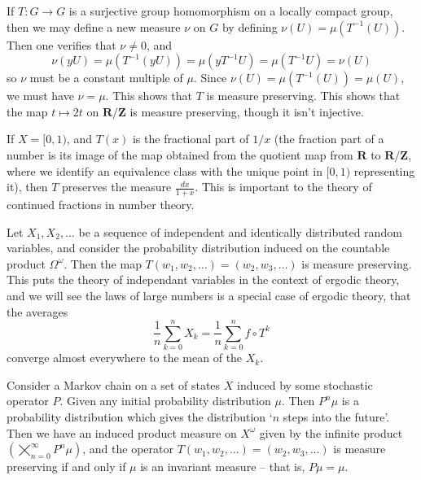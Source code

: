 \begin{example}
    If $T: G \to G$ is a surjective group homomorphism on a locally compact group, then we may define a new measure $\nu$ on $G$ by defining $\nu(U) = \mu(T^{-1}(U))$. Then one verifies that $\nu \neq 0$, and
    \[ \nu(yU) = \mu(T^{-1}(yU)) = \mu(yT^{-1}U) = \mu(T^{-1}U) = \nu(U) \]
    so $\nu$ must be a constant multiple of $\mu$. Since $\nu(U) = \mu(T^{-1}(U)) = \mu(U)$, we must have $\nu = \mu$. This shows that $T$ is measure preserving. This shows that the map $t \mapsto 2t$ on $\mathbf{R}/\mathbf{Z}$ is measure preserving, though it isn't injective.
\end{example}

\begin{example}
    If $X = [0,1)$, and $T(x)$ is the fractional part of $1/x$ (the fraction part of a number is its image of the map obtained from the quotient map from $\mathbf{R}$ to $\mathbf{R}/\mathbf{Z}$, where we identify an equivalence class with the unique point in $[0,1)$ representing it), then $T$ preserves the measure $\frac{dx}{1+x}$. This is important to the theory of continued fractions in number theory.
\end{example}

\begin{example}
    Let $X_1, X_2, \dots$ be a sequence of independent and identically distributed random variables, and consider the probability distribution induced on the countable product $\Omega^\omega$. Then the map $T(w_1, w_2, \dots) = (w_2, w_3, \dots)$ is measure preserving. This puts the theory of independant variables in the context of ergodic theory, and we will see the laws of large numbers is a special case of ergodic theory, that the averages
    \[ \frac{1}{n} \sum_{k = 0}^n X_k = \frac{1}{n} \sum_{k = 0}^n f \circ T^k \]
    converge almost everywhere to the mean of the $X_k$.
\end{example}

\begin{example}
    Consider a Markov chain on a set of states $X$ induced by some stochastic operator $P$. Given any initial probability distribution $\mu$. Then $P^n\mu$ is a probability distribution which gives the distribution `$n$ steps into the future'. Then we have an induced product measure on $X^\omega$ given by the infinite product $\left( \bigtimes_{n = 0}^\infty P^n\mu \right)$, and the operator $T(w_1, w_2, \dots) = (w_2, w_3, \dots)$ is measure preserving if and only if $\mu$ is an invariant measure -- that is, $P\mu = \mu$.
\end{example}

